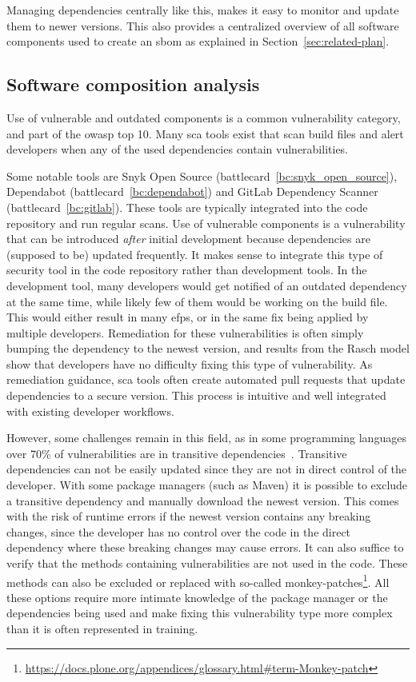 Managing dependencies centrally like this, makes it easy to monitor and update them to newer versions.
This also provides a centralized overview of all software components used to create an \gls{sbom} as explained in Section~\ref{sec:related-plan}.

\subsection{Software composition analysis}
Use of vulnerable and outdated components is a common vulnerability category, and part of the \gls{owasp} top 10.
Many \gls{sca} tools exist that scan build files and alert developers when any of the used dependencies contain vulnerabilities.

Some notable tools are Snyk Open Source (battlecard~\ref{bc:snyk_open_source}), Dependabot (battlecard~\ref{bc:dependabot}) and GitLab Dependency Scanner (battlecard~\ref{bc:gitlab}).
These tools are typically integrated into the code repository and run regular scans.
Use of vulnerable components is a vulnerability that can be introduced \textit{after} initial development because dependencies are (supposed to be) updated frequently.
It makes sense to integrate this type of security tool in the code repository rather than development tools.
In the development tool, many developers would get notified of an outdated dependency at the same time, while likely few of them would be working on the build file.
This would either result in many \glspl{efp}, or in the same fix being applied by multiple developers.
Remediation for these vulnerabilities is often simply bumping the dependency to the newest version, and results from the Rasch model show that developers have no difficulty fixing this type of vulnerability.
As remediation guidance, \gls{sca} tools often create automated pull requests that update dependencies to a secure version.
This process is intuitive and well integrated with existing developer workflows.

However, some challenges remain in this field, as in some programming languages over 70\% of vulnerabilities are in transitive dependencies~\cite{snyk2020}.
Transitive dependencies can not be easily updated since they are not in direct control of the developer.
With some package managers (such as Maven) it is possible to exclude a transitive dependency and manually download the newest version.
This comes with the risk of runtime errors if the newest version contains any breaking changes, since the developer has no control over the code in the direct dependency where these breaking changes may cause errors.
It can also suffice to verify that the methods containing vulnerabilities are not used in the code.
These methods can also be excluded or replaced with so-called monkey-patches\footnote{\url{https://docs.plone.org/appendices/glossary.html\#term-Monkey-patch}}.
All these options require more intimate knowledge of the package manager or the dependencies being used and make fixing this vulnerability type more complex than it is often represented in training.